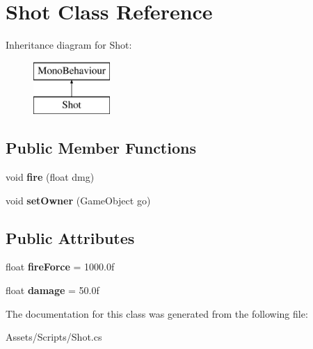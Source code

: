 \hypertarget{class_shot}{}\section{Shot Class Reference}
\label{class_shot}
Inheritance diagram for Shot\+:\begin{figure}[H]
\begin{center}
\leavevmode
\includegraphics[height=2.000000cm]{class_shot}
\end{center}
\end{figure}
\subsection*{Public Member Functions}
\begin{DoxyCompactItemize}
\item 
\hypertarget{class_shot_a1c90a6a43a28389266ab330a1d5cce39}{}void {\bfseries fire} (float dmg)\label{class_shot_a1c90a6a43a28389266ab330a1d5cce39}

\item 
\hypertarget{class_shot_a19a65826fd2946bf518662f13ace77d9}{}void {\bfseries set\+Owner} (Game\+Object go)\label{class_shot_a19a65826fd2946bf518662f13ace77d9}

\end{DoxyCompactItemize}
\subsection*{Public Attributes}
\begin{DoxyCompactItemize}
\item 
\hypertarget{class_shot_ab122de347dcdf571ce02344e0900bc6b}{}float {\bfseries fire\+Force} = 1000.\+0f\label{class_shot_ab122de347dcdf571ce02344e0900bc6b}

\item 
\hypertarget{class_shot_a45f3d0367ce3e6dc6025e2a771256c35}{}float {\bfseries damage} = 50.\+0f\label{class_shot_a45f3d0367ce3e6dc6025e2a771256c35}

\end{DoxyCompactItemize}


The documentation for this class was generated from the following file\+:\begin{DoxyCompactItemize}
\item 
Assets/\+Scripts/Shot.\+cs\end{DoxyCompactItemize}
